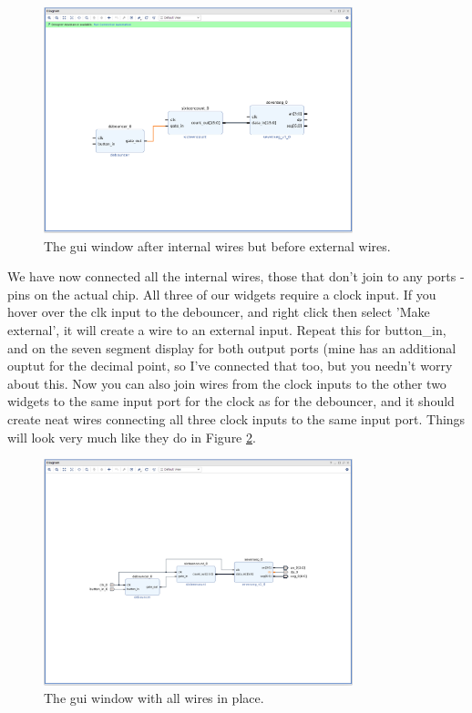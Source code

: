 \documentclass[../physical_computing.tex]{subfiles}
\begin{document}
\begin{figure}[htbp]
    \centering
    \includegraphics[width=0.8\textwidth]{figures/guitwo.png}
    \caption{The gui window after internal wires but before external wires.}
    \label{fig:guitwo}
\end{figure}

We have now connected all the internal wires, those that don't join to any ports - pins on the actual chip. All three of our widgets require a clock input. If you hover over the clk input to the debouncer, and right click then select 'Make external', it will create a wire to an external input. Repeat this for button\_in, and on the seven segment display for both output ports (mine has an additional ouptut for the decimal point, so I've connected that too, but you needn't worry about this. Now you can also join wires from the clock inputs to the other two widgets to the same input port for the clock as for the debouncer, and it should create neat wires connecting all three clock inputs to the same input port. Things will look very much like they do in Figure \ref{fig:guithree}.

\begin{figure}[htbp]
    \centering
    \includegraphics[width=0.8\textwidth]{figures/guithree.png}
    \caption{The gui window with all wires in place.}
    \label{fig:guithree}
\end{figure}
\end{document}
